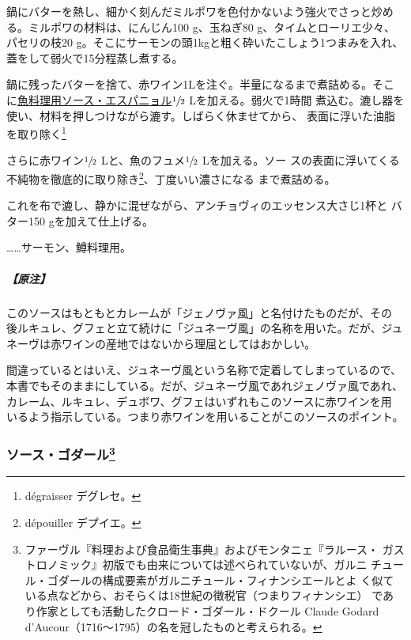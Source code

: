 鍋にバターを熱し、細かく刻んだミルポワを色付かないよう強火でさっと炒め
る。ミルポワの材料は、にんじん100 g、玉ねぎ80 g、タイムとローリエ少々、
パセリの枝20 g。そこにサーモンの頭1kgと粗く砕いたこしょう1つまみを入れ、
蓋をして弱火で15分程蒸し煮する。

鍋に残ったバターを捨て、赤ワイン1Lを注ぐ。半量になるまで煮詰める。そこ
に\protect\hyperlink{sauce-espagnole-maigre}{魚料理用ソース・エスパニョル}\(\sfrac{1}{2}\)
Lを加える。弱火で1時間
煮込む。漉し器を使い、材料を押しつけながら漉す。しばらく休ませてから、
表面に浮いた油脂を取り除く\footnote{dégraisser デグレセ。}

さらに赤ワイン\(\sfrac{1}{2}\) Lと、魚のフュメ\(\sfrac{1}{2}\)
Lを加える。ソー スの表面に浮いてくる不純物を徹底的に取り除き\footnote{dépouiller
  デプイエ。}、丁度いい濃さになる まで煮詰める。

これを布で漉し、静かに混ぜながら、アンチョヴィのエッセンス大さじ1杯と
バター150 gを加えて仕上げる。

\ldots{}\ldots{}サーモン、鱒料理用。

\hypertarget{ux539fux6ce8-3}{%
\subparagraph{【原注】}\label{ux539fux6ce8-3}}

このソースはもともとカレームが「ジェノヴァ風」と名付けたものだが、その
後ルキュレ、グフェと立て続けに「ジュネーヴ風」の名称を用いた。だが、ジュ
ネーヴは赤ワインの産地ではないから理屈としてはおかしい。

間違っているとはいえ、ジュネーヴ風という名称で定着してしまっているので、
本書でもそのままにしている。だが、ジュネーヴ風であれジェノヴァ風であれ、
カレーム、ルキュレ、デュボワ、グフェはいずれもこのソースに赤ワインを用
いるよう指示している。つまり赤ワインを用いることがこのソースのポイント。

\maeaki

\hypertarget{ux30bdux30fcux30b9ux30b4ux30c0ux30fcux30eb37}{%
\subsubsection[ソース・ゴダール]{\texorpdfstring{ソース・ゴダール\footnote{ファーヴル『料理および食品衛生事典』およびモンタニェ『ラルース・
  ガストロノミック』初版でも由来については述べられていないが、ガルニ
  チュール・ゴダールの構成要素がガルニチュール・フィナンシエールとよ
  く似ている点などから、おそらくは18世紀の徴税官（つまりフィナンシエ）
  であり作家としても活動したクロード・ゴダール・ドクール Claude Godard
  d'Aucour（1716〜1795）の名を冠したものと考えられる。}}{ソース・ゴダール}}\label{ux30bdux30fcux30b9ux30b4ux30c0ux30fcux30eb37}}

